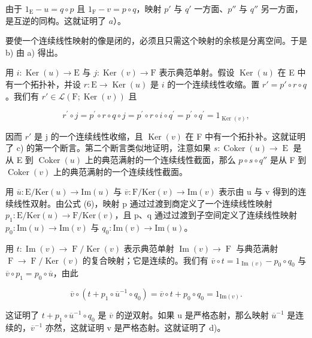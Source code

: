 由于 \(1_{\mathrm{E}} - u = q \circ p\) 且 \(1_{\mathrm{F}} - v = p \circ q\)，映射 \(p'\) 与 \(q'\) 一方面、\(p''\) 与 \(q''\) 另一方面，是互逆的同构。这就证明了 \(a\)）。

要使一个连续线性映射的像是闭的，必须且只需这个映射的余核是分离空间。于是 b) 由 a) 得出。

用 \(i\colon \operatorname{Ker}(u)\to \mathrm{E}\) 与 \(j\colon \operatorname{Ker}(v)\to \mathrm{F}\) 表示典范单射。假设 \(\operatorname{Ker}(u)\) 在 E 中有一个拓扑补，并设 \(r\colon \mathrm{E}\to \operatorname{Ker}(u)\) 是 \(i\) 的一个连续线性收缩。置 \(r' = p'\circ r\circ q\)。我们有 \(r'\in \mathcal{L}(\mathrm{F};\operatorname {Ker}(v))\) 且

\[
r ^ {\prime} \circ j = p ^ {\prime} \circ r \circ q \circ j = p ^ {\prime} \circ r \circ i \circ q ^ {\prime} = p ^ {\prime} \circ q ^ {\prime} = 1 _ {\operatorname{Ker} (v)},
\]

因而 \(r'\) 是 j 的一个连续线性收缩，且 \(\operatorname{Ker}(v)\) 在 F 中有一个拓扑补。这就证明了 c) 的第一个断言。第二个断言类似地证明，注意如果 \(s: \operatorname{Coker}(u) \to \operatorname{E}\) 是从 E 到 \(\operatorname{Coker}(u)\) 上的典范满射的一个连续线性截面，那么 \(p \circ s \circ q''\) 是从 F 到 \(\operatorname{Coker}(v)\) 上的典范满射的一个连续线性截面。

用 \(\overline{u}\colon\mathrm{E}/\mathrm{Ker}(u)\to\mathrm{Im}(u)\) 与 \(\overline{v}\colon\mathrm{F}/\mathrm{Ker}(v)\to\mathrm{Im}(v)\) 表示由 u 与 v 得到的连续线性双射。由公式 (6)，映射 p 通过过渡到商定义了一个连续线性映射 \(p_{1}\colon\mathrm{E}/\mathrm{Ker}(u)\to\mathrm{F}/\mathrm{Ker}(v)\)，且 p、q 通过过渡到子空间定义了连续线性映射 \(p_{0}\colon\mathrm{Im}(u)\to\mathrm{Im}(v)\) 与 \(q_{0}\colon\mathrm{Im}(v)\to\mathrm{Im}(u)\)。

用 \(t \colon \operatorname{Im}(v) \to \operatorname{F} / \operatorname{Ker}(v)\) 表示典范单射 \(\operatorname{Im}(v) \to \operatorname{F}\) 与典范满射 \(\operatorname{F} \to \operatorname{F} / \operatorname{Ker}(v)\) 的复合映射；它是连续的。我们有 \(\overline{v} \circ t = 1_{\operatorname{Im}(v)} - p_0 \circ q_0\) 与 \(\overline{v} \circ p_1 = p_0 \circ \overline{u}\)，由此

\[
\overline {{v}} \circ (t + p _ {1} \circ \overline {{u}} ^ {- 1} \circ q _ {0}) = \overline {{v}} \circ t + p _ {0} \circ q _ {0} = 1 _ {\mathrm{Im} (v)}.
\]

这证明了 \(t + p_{1} \circ \overline{u}^{-1} \circ q_{0}\) 是 \(\overline{v}\) 的逆双射。如果 u 是严格态射，那么映射 \(\overline{u}^{-1}\) 是连续的，\(\overline{v}^{-1}\) 亦然，这就证明 v 是严格态射。这就证明了 d)。


